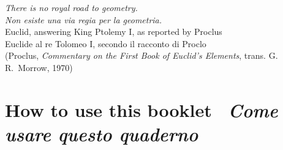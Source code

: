 \documentclass[10pt,a4paper,oneside]{book}
\begin{document}
\vspace*{\fill}
\begin{center}
\begin{minipage}{0.72\textwidth}
\raggedleft
{\large\itshape There is no royal road to geometry.}\\[2pt]
{\large\itshape\color{itgreen} Non esiste una via regia per la geometria.}\\[8pt]
{\small Euclid, answering King Ptolemy I, as reported by Proclus}\\
{\small\color{itgreen}Euclide al re Tolomeo I, secondo il racconto di Proclo}\\[2pt]
{\footnotesize\color{slate} (Proclus, \textit{Commentary on the First Book of Euclid's Elements}, trans. G.\,R.~Morrow, 1970)}
\end{minipage}
\end{center}
\vspace*{\fill}
\clearpage

\pagestyle{fancy}
\chapter*{How to use this booklet \textperiodcentered\ {\color{itgreen}\itshape Come usare questo quaderno}}
\end{document}
